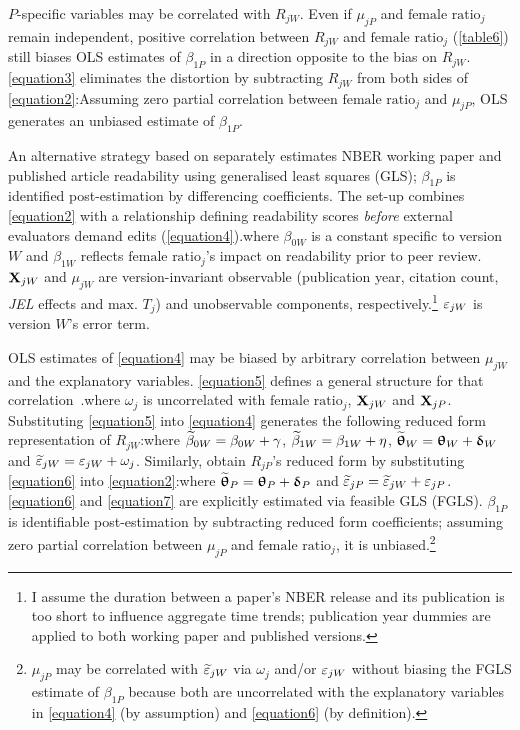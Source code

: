 $P$-specific variables may be correlated with $R_{jW}$. Even if $\mu_{jP}$ and $\text{female ratio}_j$ remain independent, positive correlation between $R_{jW}$ and $\text{female ratio}_j$ (\autoref{table6}) still biases OLS estimates of $\beta_{1P}$ in a direction opposite to the bias on $R_{jW}$. \autoref{equation3} eliminates the distortion by subtracting $R_{jW}$ from both sides of \autoref{equation2}:Assuming zero partial correlation between $\text{female ratio}_j$ and $\mu_{jP}$, OLS generates an unbiased estimate of $\beta_{1P}$.

An alternative strategy based on \citet{Ashenfelter1994} separately estimates NBER working paper and published article readability using generalised least squares (GLS); $\beta_{1P}$ is identified post-estimation by differencing coefficients. The set-up combines \autoref{equation2} with a relationship defining readability scores \emph{before} external evaluators demand edits (\autoref{equation4}).where $\beta_{0W}$ is a constant specific to version $W$ and $\beta_{1W}$ reflects $\text{female ratio}_j$'s impact on readability prior to peer review. $\mathbf{X}_{jW}$ and $\mu_{jW}$ are version-invariant observable (publication year, citation count, \emph{JEL} effects and $\text{max. }T_j$) and unobservable components, respectively.\footnote{I assume the duration between a paper's NBER release and its publication is too short to influence aggregate time trends; publication year dummies are applied to both working paper and published versions.} $\varepsilon_{jW}$ is version $W$'s error term.

OLS estimates of \autoref{equation4} may be biased by arbitrary correlation between $\mu_{jW}$ and the explanatory variables. \autoref{equation5} defines a general structure for that correlation~\citep{Ashenfelter1994}.where $\omega_j$ is uncorrelated with $\text{female ratio}_j$, $\mathbf{X}_{jW}$ and $\mathbf{X}_{jP}$. Substituting \autoref{equation5} into \autoref{equation4} generates the following reduced form representation of $R_{jW}$:where $\widetilde\beta_{0W}=\beta_{0W}+\gamma$, $\widetilde\beta_{1W}=\beta_{1W}+\eta$, $\widetilde{\bm\uptheta}_W=\bm\uptheta_W+\bm\updelta_W$ and $\widetilde{\varepsilon}_{jW}=\varepsilon_{jW}+\omega_j$. Similarly, obtain $R_{jP}$'s reduced form by substituting \autoref{equation6} into \autoref{equation2}:where $\widetilde{\bm\uptheta}_P=\bm\uptheta_P+\bm\updelta_P$ and $\widetilde{\varepsilon}_{jP}=\widetilde{\varepsilon}_{jW}+\varepsilon_{jP}$. \autoref{equation6} and \autoref{equation7} are explicitly estimated via feasible GLS (FGLS). $\beta_{1P}$ is identifiable post-estimation by subtracting reduced form coefficients; assuming zero partial correlation between $\mu_{jP}$ and $\text{female ratio}_j$, it is unbiased.\footnote{$\mu_{jP}$ may be correlated with $\widetilde{\varepsilon}_{jW}$ via $\omega_j$ and\slash or $\varepsilon_{jW}$ without biasing the FGLS estimate of $\beta_{1P}$ because both are uncorrelated with the explanatory variables in \autoref{equation4} (by assumption) and \autoref{equation6} (by definition).}

